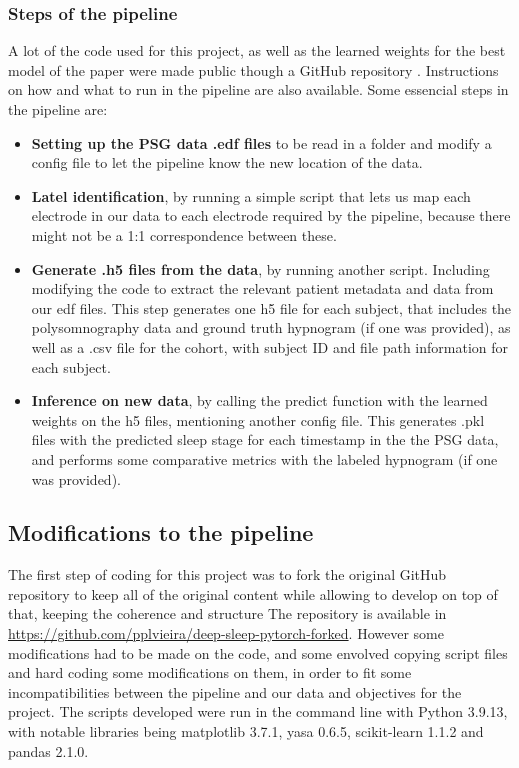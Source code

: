 \subsubsection{Steps of the pipeline}
A lot of the code used for this project, as well as the learned weights for the best model of the paper were made public though a GitHub repository \cite{Alexander2020}. Instructions on how and what to run in the pipeline are also available. Some essencial steps in the pipeline are:
\begin{itemize}
    \item \textbf{Setting up the PSG data .edf files} to be read in a folder and modify a config file to let the pipeline know the new location of the data. 
    \item \textbf{Latel identification}, by running a simple script that lets us map each electrode in our data to each electrode required by the pipeline, because there might not be a 1:1 correspondence between these.
    \item \textbf{Generate .h5 files from the data}, by running another script. Including modifying the code to extract the relevant patient metadata and data from our edf files. This step generates one h5 file for each subject, that includes the polysomnography data and ground truth hypnogram (if one was provided), as well as a .csv file for the cohort, with subject ID and file path information for each subject.
    \item \textbf{Inference on new data}, by calling the predict function with the learned weights on the h5 files, mentioning another config file. This generates .pkl files with the predicted sleep stage for each timestamp in the the PSG data, and performs some comparative metrics with the labeled hypnogram (if one was provided).
\end{itemize}



\subsection{Modifications to the pipeline} %
The first step of coding for this project was to fork the original GitHub repository \cite{Alexander2020} to keep all of the original content while allowing to develop on top of that, keeping the coherence and structure The repository is available in \href{https://github.com/pplvieira/deep-sleep-pytorch-forked}{https://github.com/pplvieira/deep-sleep-pytorch-forked}. However some modifications had to be made on the code, and some envolved copying script files and hard coding some modifications on them, in order to fit some incompatibilities between the pipeline and our data and objectives for the project.
The scripts developed were run in the command line with Python 3.9.13, with notable libraries being matplotlib 3.7.1, yasa 0.6.5, scikit-learn 1.1.2 and pandas 2.1.0.

